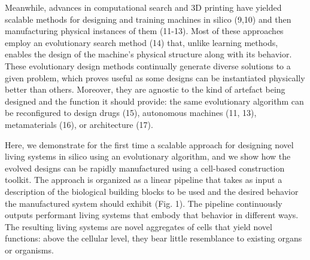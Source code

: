 Meanwhile, advances in computational search and 3D printing have yielded scalable methods for designing and training machines in silico (9,10) and then manufacturing physical instances of them (11-13). Most of these approaches employ an evolutionary search method (14) that, unlike learning methods, enables the design of the machine's physical structure along with its behavior. These evolutionary design methods continually generate diverse solutions to a given problem, which proves useful as some designs can be instantiated physically better than others. Moreover, they are agnostic to the kind of artefact being designed and the function it should provide: the same evolutionary algorithm can be reconfigured to design drugs (15), autonomous machines (11, 13), metamaterials (16), or architecture (17). 

Here, we demonstrate for the first time a scalable approach for designing novel living systems in silico using an evolutionary algorithm, and we show how the evolved designs can be rapidly manufactured using a cell-based construction toolkit. The approach is organized as a linear pipeline that takes as input a description of the biological building blocks to be used and the desired behavior the manufactured system should exhibit (Fig. 1). The pipeline continuously outputs performant living systems that embody that behavior in different ways. The resulting living systems are novel aggregates of cells that yield novel functions: above the cellular level, they bear little resemblance to existing organs or organisms.


